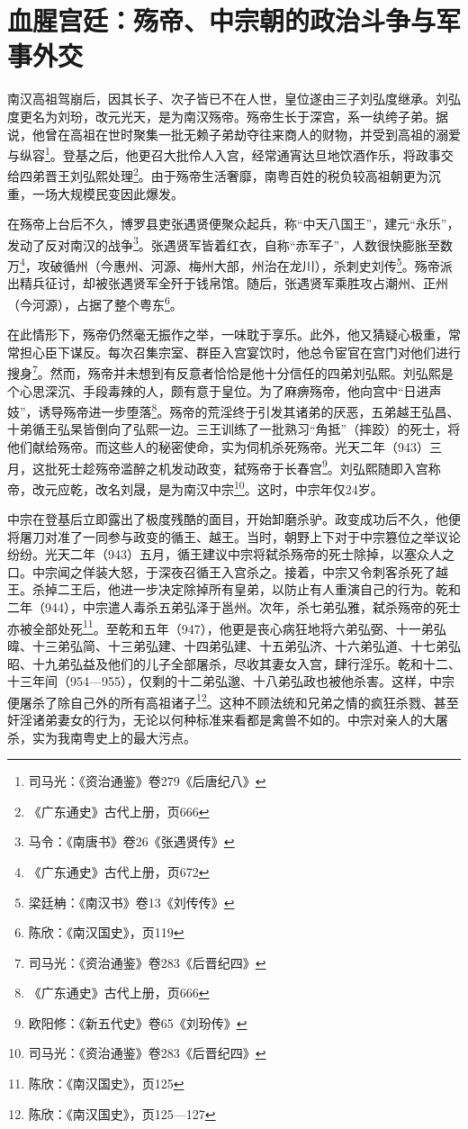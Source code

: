 \section{血腥宫廷：殇帝、中宗朝的政治斗争与军事外交}

\indent 南汉高祖驾崩后，因其长子、次子皆已不在人世，皇位遂由三子刘弘度继承。刘弘度更名为刘玢，改元光天，是为南汉殇帝。殇帝生长于深宫，系一纨绔子弟。据说，他曾在高祖在世时聚集一批无赖子弟劫夺往来商人的财物，并受到高祖的溺爱与纵容\footnote{司马光：《资治通鉴》卷279《后唐纪八》}。登基之后，他更召大批伶人入宫，经常通宵达旦地饮酒作乐，将政事交给四弟晋王刘弘熙处理\footnote{《广东通史》古代上册，页666}。由于殇帝生活奢靡，南粤百姓的税负较高祖朝更为沉重，一场大规模民变因此爆发。

在殇帝上台后不久，博罗县吏张遇贤便聚众起兵，称“中天八国王”，建元“永乐”，发动了反对南汉的战争\footnote{马令：《南唐书》卷26《张遇贤传》}。张遇贤军皆着红衣，自称“赤军子”，人数很快膨胀至数万\footnote{《广东通史》古代上册，页672}，攻破循州（今惠州、河源、梅州大部，州治在龙川），杀刺史刘传\footnote{梁廷柟：《南汉书》卷13《刘传传》}。殇帝派出精兵征讨，却被张遇贤军全歼于钱帛馆。随后，张遇贤军乘胜攻占潮州、正州（今河源），占据了整个粤东\footnote{陈欣：《南汉国史》，页119}。

在此情形下，殇帝仍然毫无振作之举，一味耽于享乐。此外，他又猜疑心极重，常常担心臣下谋反。每次召集宗室、群臣入宫宴饮时，他总令宦官在宫门对他们进行搜身\footnote{司马光：《资治通鉴》卷283《后晋纪四》}。然而，殇帝并未想到有反意者恰恰是他十分信任的四弟刘弘熙。刘弘熙是个心思深沉、手段毒辣的人，颇有意于皇位。为了麻痹殇帝，他向宫中“日进声妓”，诱导殇帝进一步堕落\footnote{《广东通史》古代上册，页666}。殇帝的荒淫终于引发其诸弟的厌恶，五弟越王弘昌、十弟循王弘杲皆倒向了弘熙一边。三王训练了一批熟习“角抵”（摔跤）的死士，将他们献给殇帝。而这些人的秘密使命，实为伺机杀死殇帝。光天二年（943）三月，这批死士趁殇帝滥醉之机发动政变，弑殇帝于长春宫\footnote{欧阳修：《新五代史》卷65《刘玢传》}。刘弘熙随即入宫称帝，改元应乾，改名刘晟，是为南汉中宗\footnote{司马光：《资治通鉴》卷283《后晋纪四》}。这时，中宗年仅24岁。

中宗在登基后立即露出了极度残酷的面目，开始卸磨杀驴。政变成功后不久，他便将屠刀对准了一同参与政变的循王、越王。当时，朝野上下对于中宗篡位之举议论纷纷。光天二年（943）五月，循王建议中宗将弑杀殇帝的死士除掉，以塞众人之口。中宗闻之佯装大怒，于深夜召循王入宫杀之。接着，中宗又令刺客杀死了越王。杀掉二王后，他进一步决定除掉所有皇弟，以防止有人重演自己的行为。乾和二年（944），中宗遣人毒杀五弟弘泽于邕州。次年，杀七弟弘雅，弑杀殇帝的死士亦被全部处死\footnote{陈欣：《南汉国史》，页125}。至乾和五年（947），他更是丧心病狂地将六弟弘弼、十一弟弘暐、十三弟弘简、十三弟弘建、十四弟弘建、十五弟弘济、十六弟弘道、十七弟弘昭、十九弟弘益及他们的儿子全部屠杀，尽收其妻女入宫，肆行淫乐。乾和十二、十三年间（954—955），仅剩的十二弟弘邈、十八弟弘政也被他杀害。这样，中宗便屠杀了除自己外的所有高祖诸子\footnote{陈欣：《南汉国史》，页125—127}。这种不顾法统和兄弟之情的疯狂杀戮、甚至奸淫诸弟妻女的行为，无论以何种标准来看都是禽兽不如的。中宗对亲人的大屠杀，实为我南粤史上的最大污点。

